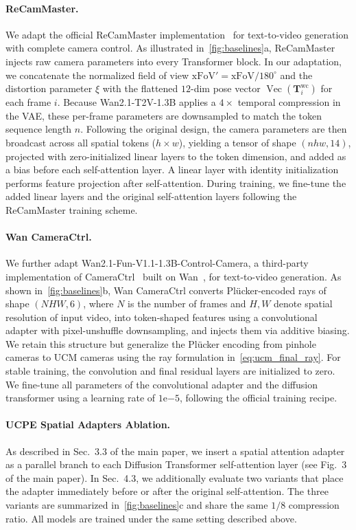 \paragraph{ReCamMaster.}
We adapt the official ReCamMaster implementation~\cite{bai2025recammaster} for text-to-video generation with complete camera control.
As illustrated in~\cref{fig:baselines}a, ReCamMaster injects raw camera parameters into every Transformer block.
In our adaptation, we concatenate the normalized field of view \(\mathrm{xFoV}'=\mathrm{xFoV}/180^\circ\) and the distortion parameter \(\xi\) with the flattened \(12\)-dim pose vector \(\operatorname{Vec}(\mathbf{T}^{\mathrm{wc}}_i)\) for each frame \(i\).
Because Wan2.1-T2V-1.3B applies a \(4\times\) temporal compression in the VAE, these per-frame parameters are downsampled to match the token sequence length \(n\).
Following the original design, the camera parameters are then broadcast across all spatial tokens (\(h \times w\)), yielding a tensor of shape \((nhw, 14)\), projected with zero-initialized linear layers to the token dimension, and added as a bias before each self-attention layer.
A linear layer with identity initialization performs feature projection after self-attention.
During training, we fine-tune the added linear layers and the original self-attention layers following the ReCamMaster training scheme.

\paragraph{Wan CameraCtrl.}
We further adapt Wan2.1-Fun-V1.1-1.3B-Control-Camera, a third-party implementation of CameraCtrl~\cite{he2024cameractrl} built on Wan~\cite{wan2025wan}, for text-to-video generation.
As shown in~\cref{fig:baselines}b, Wan CameraCtrl converts Pl\"ucker-encoded rays of shape \((NHW, 6)\), where \(N\) is the number of frames and \(H, W\) denote spatial resolution of input video, into token-shaped features using a convolutional adapter with pixel-unshuffle downsampling, and injects them via additive biasing.
We retain this structure but generalize the Pl\"ucker encoding from pinhole cameras to UCM cameras using the ray formulation in~\cref{eq:ucm_final_ray}.
For stable training, the convolution and final residual layers are initialized to zero.
We fine-tune all parameters of the convolutional adapter and the diffusion transformer using a learning rate of \(1\mathrm{e}{-5}\), following the official training recipe.

\paragraph{UCPE Spatial Adapters Ablation.}
As described in Sec.~3.3 of the main paper, we insert a spatial attention adapter as a parallel branch to each Diffusion Transformer self-attention layer (see Fig.~3 of the main paper).
In Sec.~4.3, we additionally evaluate two variants that place the adapter immediately before or after the original self-attention.
The three variants are summarized in~\cref{fig:baselines}c and share the same \(1/8\) compression ratio.
All models are trained under the same setting described above.

